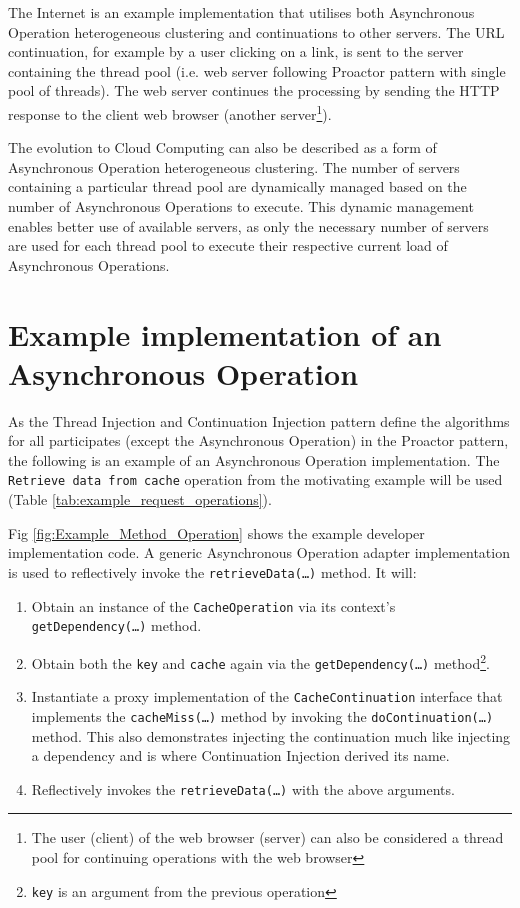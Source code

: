 \documentclass[prodmode]{style/acmlarge}
\begin{document}
The Internet is an example implementation that utilises both Asynchronous
Operation heterogeneous clustering and continuations to other servers.  The URL
continuation, for example by a user clicking on a link, is sent to the server
containing the thread pool (i.e. web server following Proactor pattern with
single pool of threads).  The web server continues the processing by sending the
HTTP response to the client web browser (another server\footnote{The user
(client) of the web browser (server) can also be considered a thread pool for
continuing operations with the web browser}).

The evolution to Cloud Computing can also be described as a form of Asynchronous
Operation heterogeneous clustering.  The number of servers containing a
particular thread pool are dynamically managed based on the number of
Asynchronous Operations to execute.  This dynamic management enables better use
of available servers, as only the necessary number of servers are used for each
thread pool to execute their respective current load of Asynchronous Operations.


\section{Example implementation of an Asynchronous Operation}

As the Thread Injection and Continuation Injection pattern define the algorithms
for all participates (except the Asynchronous Operation) in the Proactor
pattern, the following is an example of an Asynchronous Operation
implementation.  The \texttt{Retrieve data from cache} operation from the
motivating example will be used (Table \ref{tab:example_request_operations}).

Fig \ref{fig:Example_Method_Operation} shows the example developer
implementation code.  A generic Asynchronous Operation adapter implementation is
used to reflectively invoke the \texttt{retrieveData(\ldots)} method. It will:
\begin{enumerate}
  \item Obtain an instance of the \texttt{CacheOperation} via its context's \texttt{getDependency(\ldots)} method.
  \item Obtain both the \texttt{key} and \texttt{cache} again via the \texttt{getDependency(\ldots)} method\footnote{\texttt{key} is an argument from the previous operation}.
  \item Instantiate a proxy implementation of the \texttt{CacheContinuation} interface that implements the \texttt{cacheMiss(\ldots)} method by invoking the \texttt{doContinuation(\ldots)} method.  This also demonstrates injecting the continuation much like injecting a dependency and is where Continuation Injection derived its name. 
  \item Reflectively invokes the \texttt{retrieveData(\ldots)} with the above arguments.
\end{enumerate}
\end{document}
